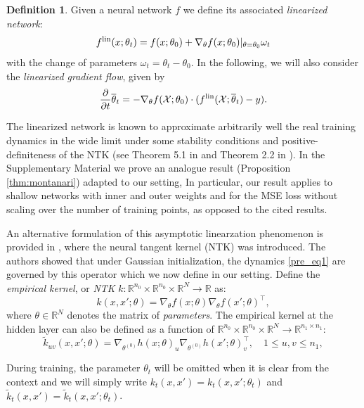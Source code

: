 \documentclass{article}
\theoremstyle{definition}
\newtheorem{defn}[thm]{Definition}
\theoremstyle{remark}
\numberwithin{equation}{section}
\newcommand{\X}{\mathcal{X}}
\newcommand{\R}{\mathbb{R}}
\newcommand{\lin}{{\textup{lin}}}
\begin{document}
\begin{defn}
    Given a neural network $f$ we define its associated \emph{linearized network}:
\[
    f^\lin(x;\theta_t) = f(x;\theta_0)+ \nabla_{\theta} f(x;\theta_0) \vert_{\theta = \theta_0} \omega_t
\]
with the change of parameters $\omega_t = \theta_t-\theta_0$.
In the following, we will also consider the \emph{linearized gradient flow}, given by
\[
    \frac{\partial}{\partial t} {\overline \theta_t} = -\nabla_\theta f(\X;\theta_0) \cdot (f^\lin(\X;\overline \theta_t)-y).
\]
\end{defn}

The linearized network is known to approximate arbitrarily well the real training dynamics in the wide limit under some stability conditions and positive-definiteness of the NTK 
(see Theorem 5.1 in \cite{Bartlett_Montanari_Rakhlin_2021} and Theorem 2.2 in \cite{bachchizat}).
In the Supplementary Material we prove an analogue result (Proposition \ref{thm:montanari}) adapted to our setting,
In particular, our result applies to shallow networks with inner and outer weights and for the MSE loss without scaling over the number of training points, as opposed to the cited results.

An alternative formulation of this asymptotic linearzation phenomenon is provided in \cite{jacot}, 
where the neural tangent kernel (NTK) was introduced.
The authors showed that under 
Gaussian initialization,
the dynamics \eqref{pre_eq1} are governed by this operator which we now define in our setting.
Define the \emph{empirical kernel}, or \emph{NTK} $k \colon \R^{n_0} \times \R^{n_0} \times \R^N \to \R$ as:
\[
    k(x,x';\theta) = \nabla_{\theta}f(x;\theta) \nabla_{\theta}f(x';\theta)^\top,
\]
where $\theta \in \R^N$ denotes the matrix of \emph{parameters}.
The empirical kernel at the hidden layer can also be defined as a function of $\R^{n_0} \times \R^{n_0} \times \R^N\to \R^{n_1 \times n_1}$:
\[
    \tilde k_{uv}(x,x';\theta) = \nabla_{\theta^{(0)}}h(x;\theta)_u \nabla_{\theta^{(0)}}h(x';\theta)_v^\top, \quad 1 \le u,v \le n_1,
\]

During training, the parameter $\theta_t$ will be omitted when it is clear from the context and we will simply write $k_t(x,x') = k_t(x,x';\theta_t)$ and $\tilde k_t(x,x') = \tilde k_t(x,x';\theta_t)$.
\end{document}
